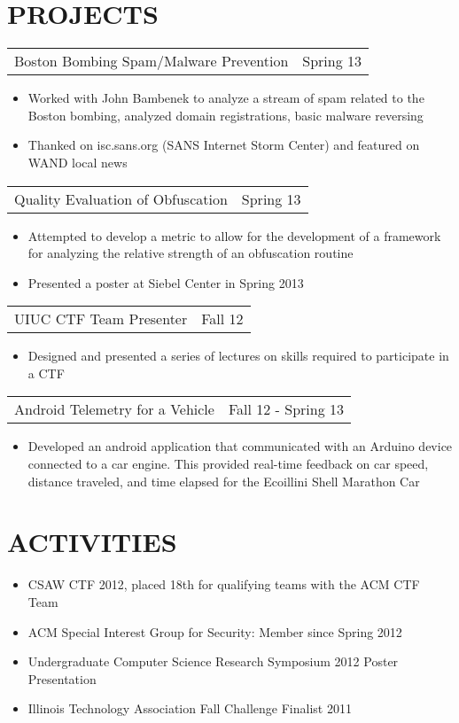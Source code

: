 \documentclass[margin]{res}
\begin{document}
\begin{resume}
\section{PROJECTS}
\begin{tabular}{p{3in} r} %
Boston Bombing Spam/Malware Prevention & Spring 13
\end{tabular}
\begin{itemize} \itemsep -2pt
\item Worked with John Bambenek to analyze a stream of spam related
  to the Boston bombing, analyzed domain registrations, basic malware
  reversing
\item Thanked on isc.sans.org (SANS Internet Storm Center) and featured on WAND local news
\end{itemize}
\begin{tabular}{p{3in} r} %
Quality Evaluation of Obfuscation & Spring 13
\end{tabular}
\begin{itemize} \itemsep -2pt
\item Attempted to develop a metric to allow for the development of
  a framework for analyzing the relative strength of an obfuscation
  routine
\item Presented a poster at Siebel Center in Spring 2013
\end{itemize}
\begin{tabular}{p{3in} r} %
UIUC CTF Team Presenter & Fall 12
\end{tabular}
\begin{itemize} \itemsep -2pt
\item  Designed and presented a series of lectures on skills required to
  participate in a CTF
\end{itemize}
\begin{tabular}{p{3in} r} %
Android Telemetry for a Vehicle & Fall 12 - Spring 13
\end{tabular}
\begin{itemize} \itemsep -2pt
\item Developed an android application that communicated with an
  Arduino device connected to a car engine.  This provided real-time
  feedback on car speed, distance traveled, and time elapsed for the
  Ecoillini Shell Marathon Car
\end{itemize}

\section{ACTIVITIES}
\begin{itemize} \itemsep -2pt
\item CSAW CTF 2012, placed 18th for qualifying teams with the ACM CTF Team
\item ACM Special Interest Group for Security: Member since Spring 2012
\item Undergraduate Computer Science Research Symposium 2012 Poster Presentation
\item Illinois Technology Association Fall Challenge Finalist 2011
\end{itemize}
\end{resume}
\end{document}
